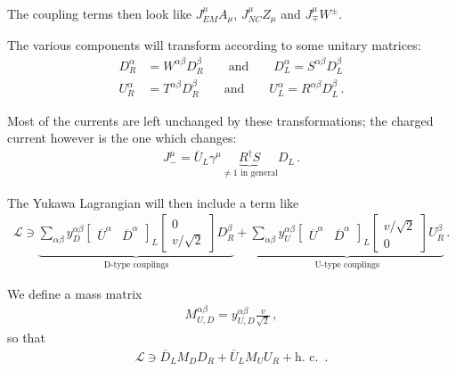 \documentclass[main.tex]{subfiles}
\begin{document}
The coupling terms then look like \(J^{\mu }_{EM} A_\mu \), \(J^{\mu }_{NC} Z_\mu \) and \(J^{\mu }_{\mp} W^{\pm}\). 

The various components will transform according to some unitary matrices: 
%
\begin{align}
D^{\alpha }_{R} &= W^{\alpha \beta } D^{\beta }_{R} 
\qquad \text{and} \qquad
D^{\alpha }_{L} = S^{\alpha \beta } D^{\beta }_{L}  \\
U^{\alpha }_{R} &= T^{\alpha \beta } D^{\beta }_{R} 
\qquad \text{and} \qquad
U^{\alpha }_{L} = R^{\alpha \beta } D^{\beta }_{L}  
\,.
\end{align}

Most of the currents are left unchanged by these transformations;
the charged current however is the one which changes: 
%
\begin{align}
J^{\mu }_{-} = \overline{U}_L \gamma^{\mu } \underbrace{R ^\dag S}_{\neq 1 \text{ in general}} D_L
\,.
\end{align}

The Yukawa Lagrangian will then include a term like 
%
\begin{align}
\mathscr{L} \ni 
\underbrace{\sum _{\alpha \beta } y^{\alpha \beta }_{D} \left[\begin{array}{cc}
\overline{U}^{\alpha } & \overline{D}^{\alpha }
\end{array}\right]_L
\left[\begin{array}{c}
0 \\ 
v / \sqrt{2}
\end{array}\right]
D^{\beta }_{R}}_{\text{D-type couplings}}
+ \underbrace{\sum _{ \alpha \beta } y^{\alpha \beta }_{U} 
\left[\begin{array}{cc}
\overline{U}^{\alpha } & \overline{D}^{\alpha }
\end{array}\right]_L
\left[\begin{array}{c}
v / \sqrt{2} \\ 
0
\end{array}\right]
U^{\beta }_R}_{\text{U-type couplings}}
\,.
\end{align}

We define a mass matrix 
%
\begin{align}
M^{\alpha \beta }_{U, D} = y^{\alpha \beta }_{U, D} \frac{v}{\sqrt{2}}
\,,
\end{align}
%
so that 
%
\begin{align}
\mathscr{L} \ni \overline{D}_L M_D D_R + \overline{U}_L M_U U_R + 
\text{h. c. }
\,.
\end{align}
\end{document}
